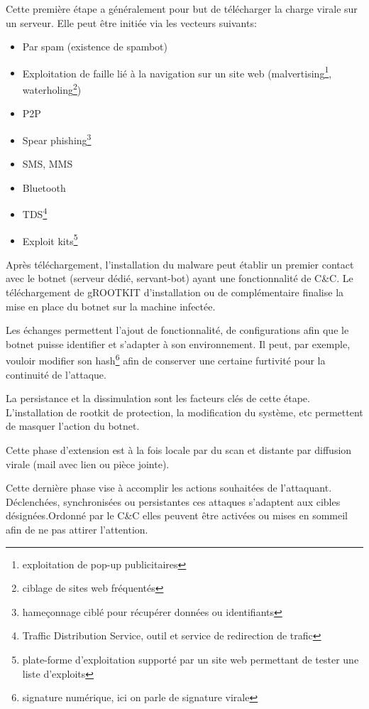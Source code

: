   \head{}
Cette première étape a généralement pour but de télécharger la charge virale sur un serveur.
Elle peut être initiée via les vecteurs suivants:
	 \begin{itemize}
		 \item Par spam (existence de spambot)
		 \item Exploitation de faille lié à la navigation sur un site web (malvertising\footnote{exploitation de pop-up publicitaires}, waterholing\footnote{ciblage de sites web fréquentés})
		 \item P2P
		 \item Spear phishing\footnote{hameçonnage ciblé pour récupérer données ou identifiants}
		 \item SMS, MMS
		 \item Bluetooth
		 \item TDS\footnote{Traffic Distribution Service, outil et service de redirection de trafic}
		 \item Exploit kits\footnote{plate-forme d'exploitation supporté par un site web permettant de tester une liste d'exploits}
	 \end{itemize}
	
Après téléchargement, l'installation du malware peut établir un premier contact avec le botnet (serveur dédié, servant-bot) ayant une fonctionnalité de C\&C.
Le téléchargement de \gls{gROOTKIT} d'installation ou de  complémentaire finalise la mise en place du botnet sur la machine infectée.	
	
Les échanges permettent l'ajout de fonctionnalité, de configurations afin que le botnet puisse identifier et s'adapter à son environnement.
Il peut, par exemple, vouloir modifier son hash\footnote{signature numérique, ici on parle de signature virale} afin de conserver une certaine furtivité pour la continuité de l'attaque.

La persistance et la dissimulation sont les facteurs clés de cette étape. L'installation de rootkit de protection, la modification du système, etc permettent de masquer l'action du botnet.
	
Cette phase d'extension est à la fois locale par du scan et distante par diffusion virale (mail avec lien ou pièce jointe).
	
Cette dernière phase vise à accomplir les actions souhaitées de l'attaquant. 
Déclenchées, synchronisées ou persistantes ces attaques s'adaptent aux cibles désignées.Ordonné par le C\&C elles peuvent être activées ou mises en sommeil afin de ne pas attirer l'attention.




